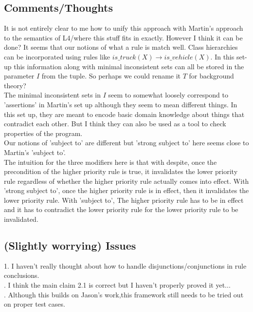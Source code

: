 \subsection{Comments/Thoughts}
It is not entirely clear to me how to unify this approach with Martin's approach to the semantics of L4/where this stuff fits in exactly. However I think it can be done? It seems that our notions of what a rule is match well. Class hierarchies can be incorporated using rules like $is\_truck(X)\rightarrow is\_vehicle(X)$. In this set-up this information along with minimal inconsistent sets can all be stored in the parameter $I$ from the tuple. So perhaps we could rename it $T$ for background theory?\\
\newline
The minimal inconsistent sets in $I$ seem to somewhat loosely correspond to 'assertions' in Martin's set up although they seem to mean different things. In this set up, they are meant to encode basic domain knowledge about things that contradict each other. But I think they can also be used as a tool to check properties of the program.\\
\newline
Our notions of 'subject to' are different but 'strong subject to' here seems close to Martin's 'subject to'.\\
\newline
The intuition for the three modifiers here is that with despite, once the precondition of the higher priority rule is true, it invalidates the lower priority rule regardless of whether the higher priority rule actually comes into effect. With 'strong subject to', once the higher priority rule is in effect, then it invalidates the lower priority rule. With 'subject to', The higher priority rule has to be in effect and it has to contradict the lower priority rule for the lower priority rule to be invalidated.\\
\subsection{(Slightly worrying) Issues}
1. I haven't really thought about how to handle disjunctions/conjunctions in rule conclusions.\\
. I think the main claim 2.1 is correct but I haven't properly proved it yet...\\
. Although this builds on Jason's work,this framework still needs to be tried out on proper test cases.
